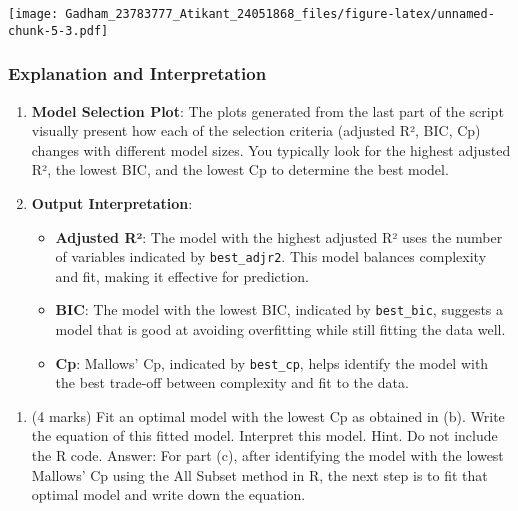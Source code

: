 \documentclass[
]{article}
\providecommand{\tightlist}{%
  \setlength{\itemsep}{0pt}\setlength{\parskip}{0pt}}
\begin{document}
\texttt{[image: Gadham\_23783777\_Atikant\_24051868\_files/figure-latex/unnamed-chunk-5-3.pdf]}

\hypertarget{explanation-and-interpretation}{%
\subsubsection{Explanation and
Interpretation}\label{explanation-and-interpretation}}

\begin{enumerate}
\def\labelenumi{\arabic{enumi}.}
\item
  \textbf{Model Selection Plot}: The plots generated from the last part
  of the script visually present how each of the selection criteria
  (adjusted R², BIC, Cp) changes with different model sizes. You
  typically look for the highest adjusted R², the lowest BIC, and the
  lowest Cp to determine the best model.
\item
  \textbf{Output Interpretation}:

  \begin{itemize}
  \tightlist
  \item
    \textbf{Adjusted R²}: The model with the highest adjusted R² uses
    the number of variables indicated by \texttt{best\_adjr2}. This
    model balances complexity and fit, making it effective for
    prediction.
  \item
    \textbf{BIC}: The model with the lowest BIC, indicated by
    \texttt{best\_bic}, suggests a model that is good at avoiding
    overfitting while still fitting the data well.
  \item
    \textbf{Cp}: Mallows' Cp, indicated by \texttt{best\_cp}, helps
    identify the model with the best trade-off between complexity and
    fit to the data.
  \end{itemize}
\end{enumerate}

\begin{enumerate}
\def\labelenumi{(\alph{enumi})}
\setcounter{enumi}{2}
\tightlist
\item
  (4 marks) Fit an optimal model with the lowest Cp as obtained in (b).
  Write the equation of this fitted model. Interpret this model. Hint.
  Do not include the R code. Answer: For part (c), after identifying the
  model with the lowest Mallows' Cp using the All Subset method in R,
  the next step is to fit that optimal model and write down the
  equation.
\end{enumerate}
\end{document}
